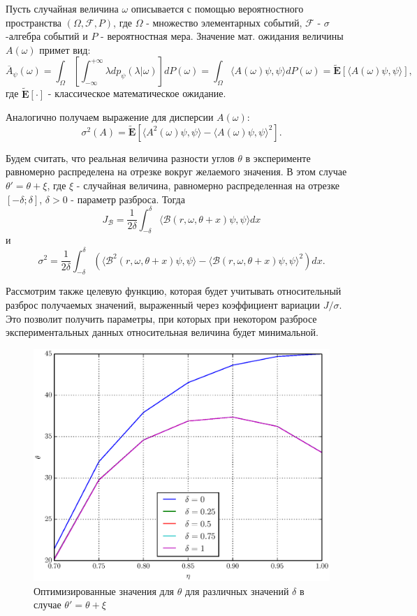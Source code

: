 \documentclass[%
master,         %
subf,           %
href,           %
,times         %
]{disser}
\numberwithin{equation}{section}
\numberwithin{figure}{section}
\begin{document}
Пусть случайная величина $\omega$ описывается с помощью вероятностного пространства $(\Omega, \mathcal{F}, P)$, где $\Omega$ - множество элементарных событий, $\mathcal{F}$ - $\sigma$-алгебра событий и $P$ - вероятностная мера. Значение мат. ожидания величины $A(\omega)$ примет вид:
\[
\overline{A}_\psi(\omega) = \int_\Omega\left[\int_{-\infty}^{+\infty}\lambda dp_\psi (\lambda|\omega)\right] dP(\omega) = \int_\Omega\langle A(\omega)\psi, \psi\rangle dP(\omega) = \mathbf{\tilde{E}}[ \langle A(\omega)\psi, \psi\rangle],
\]
где $\mathbf{\tilde{E}}[\cdot]$ - классическое математическое ожидание.

Аналогично получаем выражение для дисперсии $A(\omega)$:
\[
\sigma^2(A) = \mathbf{\tilde{E}}[ \langle A^2(\omega)\psi, \psi\rangle - \langle A(\omega)\psi, \psi\rangle^2].
\]

Будем считать, что реальная величина разности углов $\theta$ в эксперименте равномерно распределена на отрезке вокруг желаемого значения. В этом случае $\theta' = \theta + \xi$, где $\xi$ - случайная величина, равномерно распределенная на отрезке $[-\delta; \delta]$, $\delta > 0$ - параметр разброса. Тогда
\[
J_\mathcal{B} = \frac{1}{2\delta}\int_{-\delta}^\delta \langle \mathcal{B}(r, \omega, \theta + x)\psi, \psi \rangle dx
\] и
\[
\sigma^2 = \frac{1}{2\delta}\int_{-\delta}^\delta (\langle \mathcal{B}^2(r, \omega, \theta + x)\psi, \psi \rangle - \langle \mathcal{B}(r, \omega, \theta + x)\psi, \psi \rangle^2) dx.
\]


Рассмотрим также целевую функцию, которая будет учитывать относительный разброс получаемых значений, выраженный через коэффициент вариации $J / \sigma$. Это позволит получить параметры, при которых при некотором разбросе экспериментальных данных относительная величина будет минимальной.

\begin{figure}[h]
\includegraphics[scale=0.7]{theta_ang.eps}
\caption{Оптимизированные значения для $\theta$ для различных значений $\delta$ в случае $\theta' = \theta + \xi$}
\label{fig:theta_ang}
\end{figure}
\end{document}
